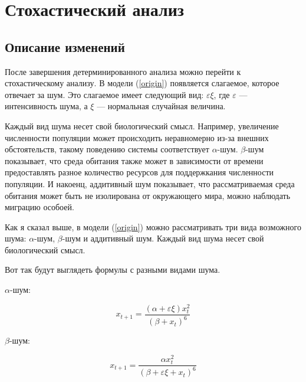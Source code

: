 \section{Стохастический анализ}

    \subsection{Описание изменений}

        После завершения детерминированного анализа можно перейти к стохастическому анализу. В модели (\ref{origin}) появляется слагаемое, которое отвечает за шум. Это слагаемое имеет следующий вид: \(\varepsilon \xi\), где \(\varepsilon\) --- интенсивность шума, а \(\xi\) --- нормальная случайная величина.

        Каждый вид шума несет свой биологический смысл. Например, увеличение численности популяции может происходить неравномерно из-за внешних обстоятельств, такому поведению системы соответствует \(\alpha\)-шум. \(\beta\)-шум показывает, что среда обитания также может в зависимости от времени предоставлять разное количество ресурсов для поддержкания численности популяции. И накоенц, аддитивный шум показывает, что рассматриваемая среда обитания может быть не изолирована от окружающего мира, можно наблюдать миграцию особоей.

        Как я сказал выше, в модели (\ref{origin}) можно рассматривать три вида возможного шума: \(\alpha\)-шум, \(\beta\)-шум и аддитивный шум. Каждый вид шума несет свой биологический смысл.


        Вот так будут выглядеть формулы с разными видами шума.

        \(\alpha\)-шум: 

        \begin{equation}
            \label{alpha_chaos}
            x_{t + 1} = \frac{(\alpha + \varepsilon \xi) x_t^2}{(\beta + x_t)^6}
        \end{equation}

        \(\beta\)-шум:

        \begin{equation}
            \label{beta_chaos}
            x_{t + 1} = \frac{\alpha x_t^2}{(\beta + \varepsilon \xi + x_t)^6}
        \end{equation}

